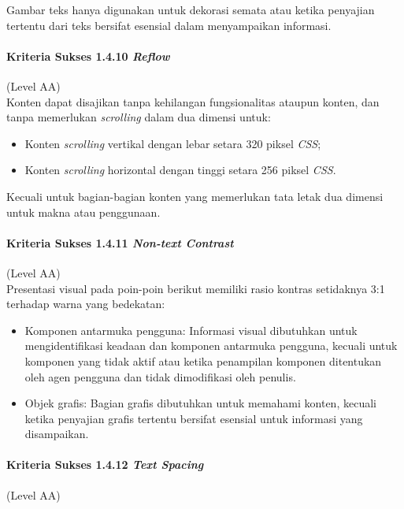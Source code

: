 \documentclass[a4paper,twoside]{article}
\begin{document}
\begin{enumerate}
		Gambar teks hanya digunakan untuk dekorasi semata atau ketika penyajian tertentu dari teks bersifat esensial dalam menyampaikan informasi.

		\paragraph{Kriteria Sukses 1.4.10 \textit{Reflow}}
		\label{sec:kriteria_sukses_1.4.10}
		(Level AA)\\

		Konten dapat disajikan tanpa kehilangan fungsionalitas ataupun konten, dan tanpa memerlukan \textit{scrolling} dalam dua dimensi untuk:

		\begin{itemize}
			\item Konten \textit{scrolling} vertikal dengan lebar setara 320 piksel \textit{CSS};
			\item Konten \textit{scrolling} horizontal dengan tinggi setara 256 piksel \textit{CSS}.
		\end{itemize}

		Kecuali untuk bagian-bagian konten yang memerlukan tata letak dua dimensi untuk makna atau penggunaan.

		\paragraph{Kriteria Sukses 1.4.11 \textit{Non-text Contrast}}
		\label{sec:kriteria_sukses_1.4.11}
		(Level AA)\\

		Presentasi visual pada poin-poin berikut memiliki rasio kontras setidaknya 3:1 terhadap warna yang bedekatan:

		\begin{itemize}
			\item Komponen antarmuka pengguna: Informasi visual dibutuhkan untuk mengidentifikasi keadaan dan komponen antarmuka pengguna, kecuali untuk komponen yang tidak aktif atau ketika penampilan komponen ditentukan oleh agen pengguna dan tidak dimodifikasi oleh penulis.
			\item Objek grafis: Bagian grafis dibutuhkan untuk memahami konten, kecuali ketika penyajian grafis tertentu bersifat esensial untuk informasi yang disampaikan.
		\end{itemize}

		\paragraph{Kriteria Sukses 1.4.12 \textit{Text Spacing}}
		\label{sec:kriteria_sukses_1.4.12}
		(Level AA)\\


\end{enumerate}
\end{document}

